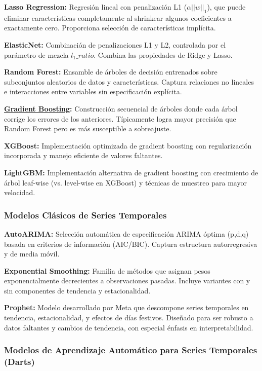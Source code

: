 \documentclass[11pt,a4paper]{article}
\newcommand{\gterm}[2]{\hyperref[glos:#1]{#2}}
\begin{document}
\textbf{Lasso Regression:} Regresión lineal con penalización L1 ($\alpha ||w||_1$), que puede eliminar características completamente al shrinkear algunos coeficientes a exactamente cero. Proporciona selección de características implícita.

\textbf{ElasticNet:} Combinación de penalizaciones L1 y L2, controlada por el parámetro de mezcla $l_1\_ratio$. Combina las propiedades de Ridge y Lasso.

\textbf{Random Forest:} Ensamble de árboles de decisión entrenados sobre subconjuntos aleatorios de datos y características. Captura relaciones no lineales e interacciones entre variables sin especificación explícita.

\textbf{\gterm{gradient-boosting}{Gradient Boosting}:} Construcción secuencial de árboles donde cada árbol corrige los errores de los anteriores. Típicamente logra mayor precisión que Random Forest pero es más susceptible a sobreajuste.

\textbf{XGBoost:} Implementación optimizada de gradient boosting con regularización incorporada y manejo eficiente de valores faltantes.

\textbf{LightGBM:} Implementación alternativa de gradient boosting con crecimiento de árbol leaf-wise (vs. level-wise en XGBoost) y técnicas de muestreo para mayor velocidad.

\subsubsection{Modelos Clásicos de Series Temporales}

\textbf{AutoARIMA:} Selección automática de especificación ARIMA óptima (p,d,q) basada en criterios de información (AIC/BIC). Captura estructura autorregresiva y de media móvil.

\textbf{Exponential Smoothing:} Familia de métodos que asignan pesos exponencialmente decrecientes a observaciones pasadas. Incluye variantes con y sin componentes de tendencia y estacionalidad.

\textbf{Prophet:} Modelo desarrollado por Meta \citep{taylor2018} que descompone series temporales en tendencia, estacionalidad, y efectos de días festivos. Diseñado para ser robusto a datos faltantes y cambios de tendencia, con especial énfasis en interpretabilidad.

\subsubsection{Modelos de Aprendizaje Automático para Series Temporales (Darts)}
\end{document}
